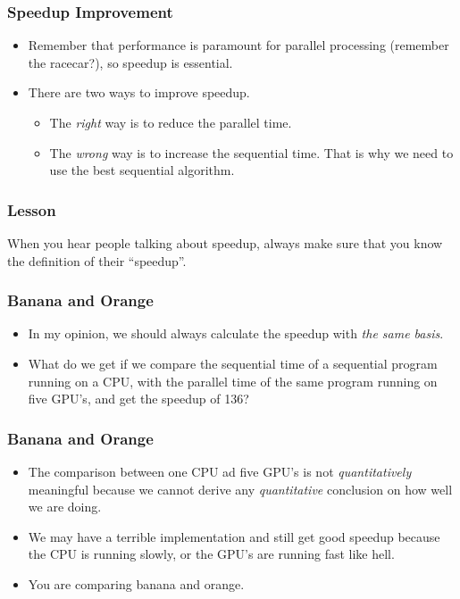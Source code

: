 \documentclass{beamer}
\begin{document}
\begin{CJK}{UTF8}{bsmi}
\begin{frame}
\frametitle{Speedup Improvement}
\begin{itemize}
\item Remember that performance is paramount for parallel processing
  (remember the racecar?), so speedup is essential.
\item There are two ways to improve speedup.
\begin{itemize}
\item The {\em right} way is to reduce the parallel time.
\item The {\em wrong} way is to increase the sequential time.  That is why
  we need to use the best sequential algorithm.
\end{itemize}
\end{itemize}
\end{frame}

\begin{frame}
\frametitle{Lesson} \huge When you hear people talking about speedup,
always make sure that you know the definition of their ``speedup''.
\end{frame}

\begin{frame}
\frametitle{Banana and Orange}
\begin{itemize}
\item In my opinion, we should always calculate the speedup with {\em
  the same basis}.
\item What do we get if we compare the sequential time of a sequential
  program running on a CPU, with the parallel time of the same program
  running on five GPU's, and get the speedup of 136?
\end{itemize}
\end{frame}

\begin{frame}
\frametitle{Banana and Orange}
\begin{itemize}
\item The comparison between one CPU ad five GPU's is not {\em
  quantitatively} meaningful because we cannot derive any {\em
  quantitative} conclusion on how well we are doing.
\item We may have a terrible implementation and still get good speedup
  because the CPU is running slowly, or the GPU's are running fast
  like hell.
\item You are comparing banana and orange.
\end{itemize}
\end{frame}


\end{CJK}
\end{document}
